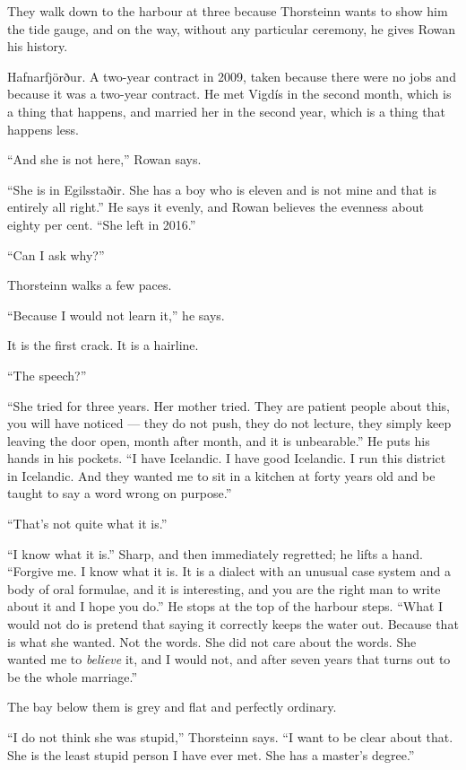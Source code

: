 \documentclass[11pt,oneside]{book}
\newcommand{\sceneline}{%
  \par\vspace{1.2em}
  \begin{center}
    \fontsize{11}{11}\selectfont \textbullet\quad\textbullet\quad\textbullet
  \end{center}
  \vspace{0.6em}\noindent\ignorespaces
}
\begin{document}
\sceneline

They walk down to the harbour at three because Thorsteinn wants to show
him the tide gauge, and on the way, without any particular ceremony, he
gives Rowan his history.

Hafnarfjörður. A two-year contract in 2009, taken because there were no
jobs and because it was a two-year contract. He met Vigdís in the second
month, which is a thing that happens, and married her in the second
year, which is a thing that happens less.

``And she is not here,'' Rowan says.

``She is in Egilsstaðir. She has a boy who is eleven and is not mine and
that is entirely all right.'' He says it evenly, and Rowan believes the
evenness about eighty per cent. ``She left in 2016.''

``Can I ask why?''

Thorsteinn walks a few paces.

``Because I would not learn it,'' he says.

It is the first crack. It is a hairline.

``The speech?''

``She tried for three years. Her mother tried. They are patient people
about this, you will have noticed --- they do not push, they do not
lecture, they simply keep leaving the door open, month after month, and
it is unbearable.'' He puts his hands in his pockets. ``I have Icelandic.
I have good Icelandic. I run this district in Icelandic. And they wanted
me to sit in a kitchen at forty years old and be taught to say a word
wrong on purpose.''

``That's not quite what it is.''

``I know what it is.'' Sharp, and then immediately regretted; he lifts a
hand. ``Forgive me. I know what it is. It is a dialect with an unusual
case system and a body of oral formulae, and it is interesting, and you
are the right man to write about it and I hope you do.'' He stops at the
top of the harbour steps. ``What I would not do is pretend that saying
it correctly keeps the water out. Because that is what she wanted. Not
the words. She did not care about the words. She wanted me to
\emph{believe} it, and I would not, and after seven years that turns out
to be the whole marriage.''

The bay below them is grey and flat and perfectly ordinary.

``I do not think she was stupid,'' Thorsteinn says. ``I want to be clear
about that. She is the least stupid person I have ever met. She has a
master's degree.''
\end{document}
